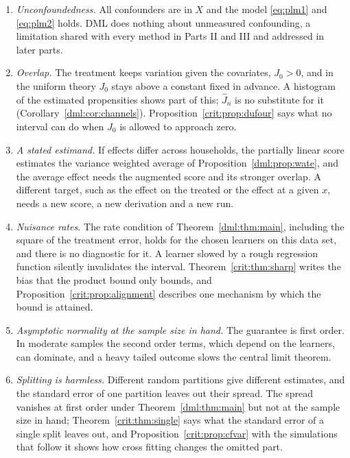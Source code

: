 \begin{enumerate}[label=(A\arabic*),leftmargin=*,itemsep=2pt]
\item \emph{Unconfoundedness.} All confounders are in $X$ and the model \eqref{eq:plm1} and \eqref{eq:plm2} holds. DML does nothing about unmeasured confounding, a limitation shared with every method in Parts II and III and addressed in later parts.
\item \emph{Overlap.} The treatment keeps variation given the covariates, $J_0 > 0$, and in the uniform theory $J_0$ stays above a constant fixed in advance. A histogram of the estimated propensities shows part of this; $\hat J_n$ is no substitute for it (Corollary~\ref{dml:cor:channels}). Proposition~\ref{crit:prop:dufour} says what no interval can do when $J_0$ is allowed to approach zero.
\item \emph{A stated estimand.} If effects differ across households, the partially linear score estimates the variance weighted average of Proposition~\ref{dml:prop:wate}, and the average effect needs the augmented score and its stronger overlap. A different target, such as the effect on the treated or the effect at a given $x$, needs a new score, a new derivation and a new run.
\item \emph{Nuisance rates.} The rate condition of Theorem~\ref{dml:thm:main}, including the square of the treatment error, holds for the chosen learners on this data set, and there is no diagnostic for it. A learner slowed by a rough regression function silently invalidates the interval. Theorem~\ref{crit:thm:sharp} writes the bias that the product bound only bounds, and Proposition~\ref{crit:prop:alignment} describes one mechanism by which the bound is attained.
\item \emph{Asymptotic normality at the sample size in hand.} The guarantee is first order. In moderate samples the second order terms, which depend on the learners, can dominate, and a heavy tailed outcome slows the central limit theorem.
\item \emph{Splitting is harmless.} Different random partitions give different estimates, and the standard error of one partition leaves out their spread. The spread vanishes at first order under Theorem~\ref{dml:thm:main} but not at the sample size in hand; Theorem~\ref{crit:thm:single} says what the standard error of a single split leaves out, and Proposition~\ref{crit:prop:cfvar} with the simulations that follow it shows how cross fitting changes the omitted part.
\end{enumerate}

